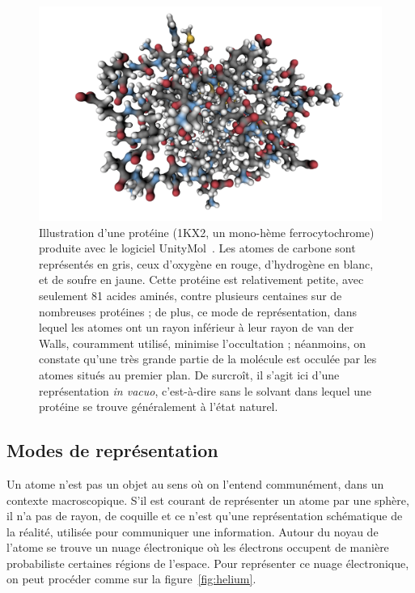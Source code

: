    \begin{figure}[htb]
		\centering
		\includegraphics[width=\textwidth]{figures/ch1/1KX2}
		\caption{Illustration d'une protéine (1KX2, un mono-hème ferrocytochrome) produite avec le logiciel UnityMol~\cite{doutreligne2014unitymol}. Les atomes de carbone sont représentés en gris, ceux d'oxygène en rouge, d'hydrogène en blanc, et de soufre en jaune. Cette protéine est relativement petite, avec seulement 81 acides aminés, contre plusieurs centaines sur de nombreuses protéines ; de plus, ce mode de représentation, dans lequel les atomes ont un rayon inférieur à leur rayon de van der Walls, couramment utilisé, minimise l'occultation ; néanmoins, on constate qu'une très grande partie de la molécule est occulée par les atomes situés au premier plan. De surcroît, il s'agit ici d'une représentation \emph{in vacuo}, c'est-à-dire sans le solvant dans lequel une protéine se trouve généralement à l'état naturel.}
		\label{fig:1KX2}
	\end{figure}
	
	\subsection{Modes de représentation}
	Un atome n'est pas un objet au sens où on l'entend communément, dans un contexte macroscopique. S'il est courant de représenter un atome par une sphère, il n'a pas de rayon, de \og coquille \fg{} et ce n'est qu'une représentation schématique de la réalité, utilisée pour communiquer une information. Autour du noyau de l'atome se trouve un nuage électronique où les électrons occupent de manière probabiliste certaines régions de l'espace. Pour représenter ce nuage électronique, on peut procéder comme sur la figure~\ref{fig:helium}.
	
